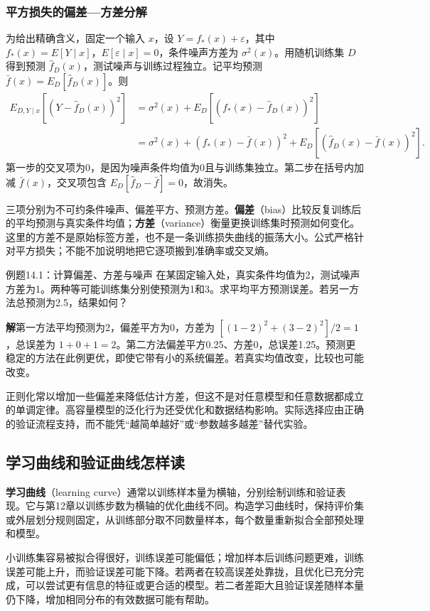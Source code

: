 \documentclass[UTF8,fontset=none,zihao=-4,a4paper]{ctexart}
\newcommand{\term}[1]{\textbf{#1}}
\newcommand{\sol}{\par\noindent\textbf{解}\quad}
\numberwithin{equation}{section}
\numberwithin{figure}{section}
\begin{document}
\subsubsection{平方损失的偏差—方差分解}
为给出精确含义，固定一个输入 $x$，设 $Y=f_*(x)+\varepsilon$，其中 $f_*(x)=E[Y\mid x]$，$E[\varepsilon\mid x]=0$，条件噪声方差为 $\sigma^2(x)$。用随机训练集 $D$ 得到预测 $\widehat f_D(x)$，测试噪声与训练过程独立。记平均预测 $\bar f(x)=E_D[\widehat f_D(x)]$。则
\begin{align}
 E_{D,Y\mid x}[(Y-\widehat f_D(x))^2]
 &=\sigma^2(x)+E_D[(f_*(x)-\widehat f_D(x))^2]\\
 &=\sigma^2(x)+(f_*(x)-\bar f(x))^2
   +E_D[(\widehat f_D(x)-\bar f(x))^2].
\end{align}
第一步的交叉项为0，是因为噪声条件均值为0且与训练集独立。第二步在括号内加减 $\bar f(x)$，交叉项包含 $E_D[\widehat f_D-\bar f]=0$，故消失。

三项分别为不可约条件噪声、偏差平方、预测方差。\term{偏差}（bias）比较反复训练后的平均预测与真实条件均值；\term{方差}（variance）衡量更换训练集时预测如何变化。这里的方差不是原始标签方差，也不是一条训练损失曲线的振荡大小。公式严格针对平方损失；不能不加说明地把它逐项搬到准确率或交叉熵。

\begin{infobox}[unbreakable]{例题14.1：计算偏差、方差与噪声}
在某固定输入处，真实条件均值为2，测试噪声方差为1。两种等可能训练集分别使预测为1和3。求平均平方预测误差。若另一方法总预测为2.5，结果如何？
\sol 第一方法平均预测为2，偏差平方为0，方差为 $[(1-2)^2+(3-2)^2]/2=1$，总误差为 $1+0+1=2$。第二方法偏差平方0.25、方差0，总误差1.25。预测更稳定的方法在此例更优，即使它带有小的系统偏差。若真实均值改变，比较也可能改变。
\end{infobox}
正则化常以增加一些偏差来降低估计方差，但这不是对任意模型和任意数据都成立的单调定律。高容量模型的泛化行为还受优化和数据结构影响。实际选择应由正确的验证流程支持，而不能凭“越简单越好”或“参数越多越差”替代实验。

\subsection{学习曲线和验证曲线怎样读}
\term{学习曲线}（learning curve）通常以训练样本量为横轴，分别绘制训练和验证表现。它与第12章以训练步数为横轴的优化曲线不同。构造学习曲线时，保持评价集或外层划分规则固定，从训练部分取不同数量样本，每个数量重新拟合全部预处理和模型。

小训练集容易被拟合得很好，训练误差可能偏低；增加样本后训练问题更难，训练误差可能上升，而验证误差可能下降。若两者在较高误差处靠拢，且优化已充分完成，可以尝试更有信息的特征或更合适的模型。若二者差距大且验证误差随样本量仍下降，增加相同分布的有效数据可能有帮助。
\end{document}
